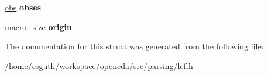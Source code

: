 \begin{DoxyCompactItemize}
\item 
\hypertarget{structophidian_1_1parsing_1_1lef_1_1macro_aad40df291320a6b9ee5aaae21be57afe}{\hyperlink{structophidian_1_1parsing_1_1lef_1_1obs}{obs} {\bfseries obses}}\label{structophidian_1_1parsing_1_1lef_1_1macro_aad40df291320a6b9ee5aaae21be57afe}

\item 
\hypertarget{structophidian_1_1parsing_1_1lef_1_1macro_a53386810479dfd48e4dbd5c7cb92042f}{\hyperlink{structophidian_1_1parsing_1_1lef_1_1macro__size}{macro\-\_\-size} {\bfseries origin}}\label{structophidian_1_1parsing_1_1lef_1_1macro_a53386810479dfd48e4dbd5c7cb92042f}

\end{DoxyCompactItemize}


The documentation for this struct was generated from the following file\-:\begin{DoxyCompactItemize}
\item 
/home/csguth/workspace/openeda/src/parsing/lef.\-h\end{DoxyCompactItemize}
